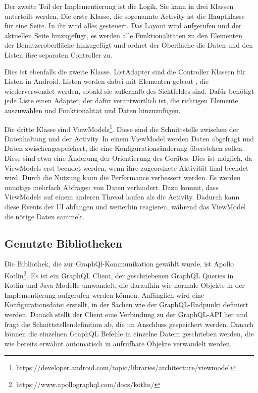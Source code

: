 Der zweite Teil der Implementierung ist die Logik. Sie kann in drei Klassen unterteilt werden. 
Die erste Klasse, die sogenannte Activity ist die Hauptklasse für eine Seite. In ihr wird alles gesteuert. Das Layout wird aufgerufen und der aktuellen Seite hinzugefügt, es werden alle Funktionalitäten zu den Elementen der Benutzeroberfläche hinzugefügt und ordnet der Oberfläche die Daten und den Listen ihre separaten Controller zu.

Dies ist ebenfalls die zweite Klasse. ListAdapter sind die Controller Klassen für Listen in Android. Listen werden dabei mit Elementen gebaut , die wiederverwendet werden, sobald sie außerhalb des Sichtfeldes sind. Dafür benötigt jede Liste einen Adapter, der dafür verantwortlich ist, die richtigen Elemente auszuwählen und Funktionalität und Daten hinzuzufügen.

Die dritte Klasse sind ViewModels\footnote{https://developer.android.com/topic/libraries/architecture/viewmodel}. Diese sind die Schnittstelle zwischen der Datenhaltung und der Activity. In einem ViewModel werden Daten abgefragt und Daten zwischengespeichert, die eine Konfigurationsänderung überstehen sollen. Diese sind etwa eine Änderung der Orientierung des Gerätes. Dies ist möglich, da ViewModels erst beendet werden, wenn ihre zugeordnete Aktivität final beendet wird. 
Durch die Nutzung kann die Performance verbessert werden. Es werden unnötige mehrfach Abfragen von Daten verhindert. Dazu kommt, dass ViewModels auf einem anderen Thread laufen als die Activity. Dadurch kann diese Events der \ac{UI} abfangen und weiterhin reagieren, während das ViewModel die nötige Daten sammelt.


\subsection{Genutzte Bibliotheken}
Die Bibliothek, die zur GraphQl-Kommunikation gewählt wurde, ist Apollo Kotlin\footnote{https://www.apollographql.com/docs/kotlin/}. 
Es ist ein GraphQL Client, der geschriebenen GraphQL Queries in Kotlin und Java Modelle umwandelt, die daraufhin wie normale Objekte in der Implementierung aufgerufen werden können. 
Anfänglich wird eine Konfigurationsdatei erstellt, in der Sachen wie der GraphQL-Endpunkt definiert werden. 
Danach stellt der Client eine Verbindung zu der GraphQL-\ac{API} her und fragt die Schnittstellendefinition ab, die im Anschluss gespeichert werden. 
Danach können die einzelnen GraphQL Befehle in einzelne Datein geschrieben werden, die wie bereits erwähnt automatisch in aufrufbare Objekte verwandelt werden.

